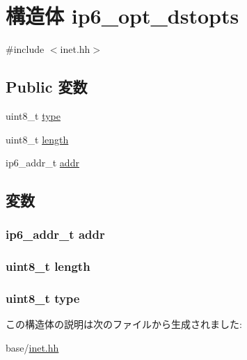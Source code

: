 \hypertarget{structNet_1_1ip6__opt__dstopts}{
\section{構造体 ip6\_\-opt\_\-dstopts}
\label{structNet_1_1ip6__opt__dstopts}
}


{\ttfamily \#include $<$inet.hh$>$}\subsection*{Public 変数}
\begin{DoxyCompactItemize}
\item 
uint8\_\-t \hyperlink{structNet_1_1ip6__opt__dstopts_a1d127017fb298b889f4ba24752d08b8e}{type}
\item 
uint8\_\-t \hyperlink{structNet_1_1ip6__opt__dstopts_ab2b3adeb2a67e656ff030b56727fd0ac}{length}
\item 
ip6\_\-addr\_\-t \hyperlink{structNet_1_1ip6__opt__dstopts_ae32b25ff633168fbdecd8d24293034cd}{addr}
\end{DoxyCompactItemize}


\subsection{変数}
\hypertarget{structNet_1_1ip6__opt__dstopts_ae32b25ff633168fbdecd8d24293034cd}{
\subsubsection[{addr}]{\setlength{\rightskip}{0pt plus 5cm}ip6\_\-addr\_\-t {\bf addr}}}
\label{structNet_1_1ip6__opt__dstopts_ae32b25ff633168fbdecd8d24293034cd}
\hypertarget{structNet_1_1ip6__opt__dstopts_ab2b3adeb2a67e656ff030b56727fd0ac}{
\subsubsection[{length}]{\setlength{\rightskip}{0pt plus 5cm}uint8\_\-t {\bf length}}}
\label{structNet_1_1ip6__opt__dstopts_ab2b3adeb2a67e656ff030b56727fd0ac}
\hypertarget{structNet_1_1ip6__opt__dstopts_a1d127017fb298b889f4ba24752d08b8e}{
\subsubsection[{type}]{\setlength{\rightskip}{0pt plus 5cm}uint8\_\-t {\bf type}}}
\label{structNet_1_1ip6__opt__dstopts_a1d127017fb298b889f4ba24752d08b8e}


この構造体の説明は次のファイルから生成されました:\begin{DoxyCompactItemize}
\item 
base/\hyperlink{inet_8hh}{inet.hh}\end{DoxyCompactItemize}
